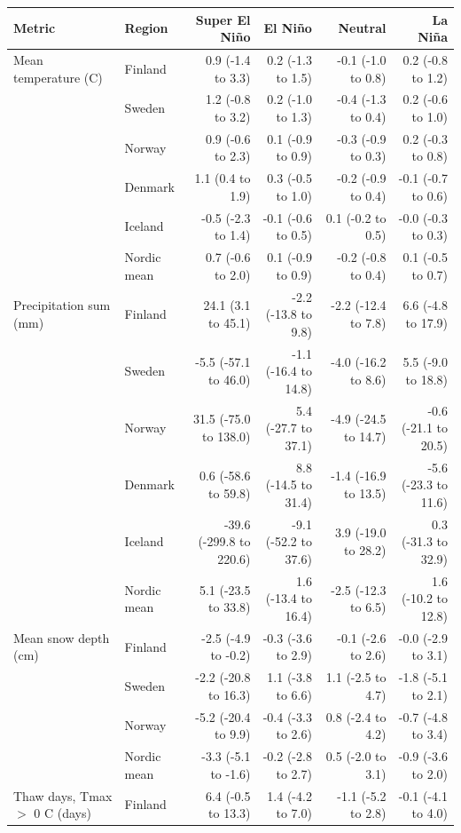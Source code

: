 \begin{tabular}{llrrrr}
\toprule
Metric & Region & Super El Niño & El Niño & Neutral & La Niña \\
\midrule
Mean temperature (\textdegree{}C) & Finland & 0.9 (-1.4 to 3.3) & 0.2 (-1.3 to 1.5) & -0.1 (-1.0 to 0.8) & 0.2 (-0.8 to 1.2) \\
 & Sweden & 1.2 (-0.8 to 3.2) & 0.2 (-1.0 to 1.3) & -0.4 (-1.3 to 0.4) & 0.2 (-0.6 to 1.0) \\
 & Norway & 0.9 (-0.6 to 2.3) & 0.1 (-0.9 to 0.9) & -0.3 (-0.9 to 0.3) & 0.2 (-0.3 to 0.8) \\
 & Denmark & 1.1 (0.4 to 1.9) & 0.3 (-0.5 to 1.0) & -0.2 (-0.9 to 0.4) & -0.1 (-0.7 to 0.6) \\
 & Iceland & -0.5 (-2.3 to 1.4) & -0.1 (-0.6 to 0.5) & 0.1 (-0.2 to 0.5) & -0.0 (-0.3 to 0.3) \\
 & Nordic mean & 0.7 (-0.6 to 2.0) & 0.1 (-0.9 to 0.9) & -0.2 (-0.8 to 0.4) & 0.1 (-0.5 to 0.7) \\
\addlinespace
Precipitation sum (mm) & Finland & 24.1 (3.1 to 45.1) & -2.2 (-13.8 to 9.8) & -2.2 (-12.4 to 7.8) & 6.6 (-4.8 to 17.9) \\
 & Sweden & -5.5 (-57.1 to 46.0) & -1.1 (-16.4 to 14.8) & -4.0 (-16.2 to 8.6) & 5.5 (-9.0 to 18.8) \\
 & Norway & 31.5 (-75.0 to 138.0) & 5.4 (-27.7 to 37.1) & -4.9 (-24.5 to 14.7) & -0.6 (-21.1 to 20.5) \\
 & Denmark & 0.6 (-58.6 to 59.8) & 8.8 (-14.5 to 31.4) & -1.4 (-16.9 to 13.5) & -5.6 (-23.3 to 11.6) \\
 & Iceland & -39.6 (-299.8 to 220.6) & -9.1 (-52.2 to 37.6) & 3.9 (-19.0 to 28.2) & 0.3 (-31.3 to 32.9) \\
 & Nordic mean & 5.1 (-23.5 to 33.8) & 1.6 (-13.4 to 16.4) & -2.5 (-12.3 to 6.5) & 1.6 (-10.2 to 12.8) \\
\addlinespace
Mean snow depth (cm) & Finland & -2.5 (-4.9 to -0.2) & -0.3 (-3.6 to 2.9) & -0.1 (-2.6 to 2.6) & -0.0 (-2.9 to 3.1) \\
 & Sweden & -2.2 (-20.8 to 16.3) & 1.1 (-3.8 to 6.6) & 1.1 (-2.5 to 4.7) & -1.8 (-5.1 to 2.1) \\
 & Norway & -5.2 (-20.4 to 9.9) & -0.4 (-3.3 to 2.6) & 0.8 (-2.4 to 4.2) & -0.7 (-4.8 to 3.4) \\
 & Nordic mean & -3.3 (-5.1 to -1.6) & -0.2 (-2.8 to 2.7) & 0.5 (-2.0 to 3.1) & -0.9 (-3.6 to 2.0) \\
\addlinespace
Thaw days, Tmax $>$ 0 \textdegree{}C (days) & Finland & 6.4 (-0.5 to 13.3) & 1.4 (-4.2 to 7.0) & -1.1 (-5.2 to 2.8) & -0.1 (-4.1 to 4.0) \\

\end{tabular}

